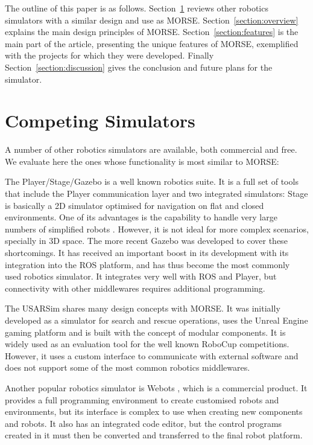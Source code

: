 \documentclass{llncs}
\begin{document}
The outline of this paper is as follows. Section~\ref{section:othersims}
reviews other robotics simulators with a similar design and use as MORSE.
Section~\ref{section:overview} explains the main design principles of MORSE.
Section~\ref{section:features} is the main part of the article, presenting the
unique features of MORSE, exemplified with the projects for which they were
developed. Finally Section~\ref{section:discussion} gives the conclusion and
future plans for the simulator.

\section{Competing Simulators}
\label{section:othersims}

A number of other robotics simulators are available, both commercial and
free. We evaluate here the ones whose functionality is most similar to MORSE:

The Player/Stage/Gazebo\cite{psg-1232} is a well known robotics suite.
It is a full set of tools that include the Player communication layer
and two integrated simulators: Stage \cite{Gerkey03theplayer/stage} is basically a
2D simulator optimised for navigation on flat and closed environments.
One of its advantages is the capability to handle very large numbers of
simplified robots \cite{springerlink:10.1007/s11721-008-0014-4}. However, it is
not ideal for more complex scenarios, specially in 3D space. The more recent
Gazebo \cite{Koenig04designand} was developed to cover these shortcomings.
It has received an important boost in its development with its integration
into the ROS platform, and has thus become the most commonly used robotics
simulator. It integrates very well with ROS and Player, but connectivity with
other middlewares requires additional programming.

The USARSim \cite{usarsim-4209284} shares many design concepts with MORSE. It
was initially developed as a simulator for search and rescue operations, uses
the Unreal Engine gaming platform and is built with the concept of modular
components. It is widely used as an evaluation tool for the well known RoboCup
competitions. However, it uses a custom interface to communicate with external
software and does not support some of the most common robotics middlewares.

Another popular robotics simulator is Webots \cite{Webots04}, which is a
commercial product. It provides a full programming environment to create
customised robots and environments, but its interface is complex to use when
creating new components and robots.
It also has an integrated code editor, but the control programs created in it
must then be converted and transferred to the final robot platform.
\end{document}
